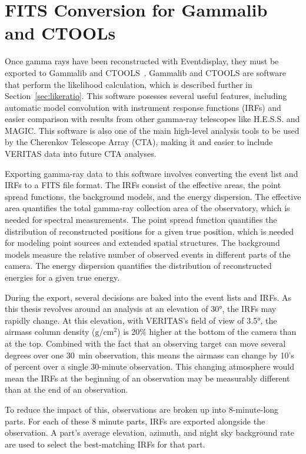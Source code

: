 \section{FITS Conversion for Gammalib and CTOOLs}\label{fitsconversion}
Once gamma rays have been reconstructed with Eventdisplay, they must be exported to Gammalib and CTOOLS~\cite{gammalibctools}.
Gammalib and CTOOLS are software that perform the likelihood calculation, which is described further in Section~\ref{sec:likeratio}.
This software posesses several useful features, including automatic model convolution with instrument response functions (IRFs) and easier comparison with results from other gamma-ray telescopes like H.E.S.S. and MAGIC.
This software is also one of the main high-level analysis tools to be used by the Cherenkov Telescope Array (CTA), making it and easier to include VERITAS data into future CTA analyses.

Exporting gamma-ray data to this software involves converting the event list and IRFs to a FITS file format.
The IRFs consist of the effective areas, the point spread functions, the background models, and the energy dispersion.
The effective area quantifies the total gamma-ray collection area of the observatory, which is needed for spectral measurements.
The point spread function quantifies the distribution of reconstructed positions for a given true position, which is needed for modeling point sources and extended spatial structures.
The background models measure the relative number of observed events in different parts of the camera.
The energy dispersion quantifies the distribution of reconstructed energies for a given true energy.

During the export, several decisions are baked into the event lists and IRFs.
As this thesis revolves around an analysis at an elevation of \nicetilde{}\ang{30}, the IRFs may rapidly change.
At this elevation, with VERITAS's field of view of \ang{3.5}, the airmass column density ($\textrm{g}/\textrm{cm}^2$) is 20\% higher at the bottom of the camera than at the top.
Combined with the fact that an observing target can move several degrees over one \SI{30}{min} observation, this means the airmass can change by 10's of percent over a single 30-minute observation.
This changing atmosphere would mean the IRFs at the beginning of an observation may be measurably different than at the end of an observation.

To reduce the impact of this, observations are broken up into 8-minute-long parts.
For each of these 8 minute parts, IRFs are exported alongside the observation.
A part's average elevation, azimuth, and night sky background rate are used to select the best-matching IRFs for that part.

